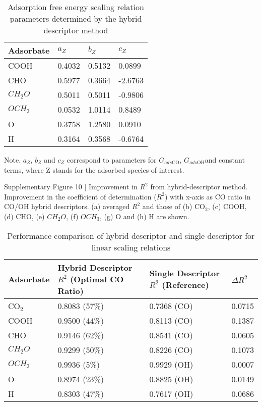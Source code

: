 \begin{table}[h]
  \centering
  {\fontsize{10}{12}\selectfont
  \begin{tabular}{*{4}{l}}
    \hline
    \textbf{Adsorbate} & \textbf{$a_Z$}  & \textbf{$b_Z$}  & \textbf{$c_Z$}   \\
    \hline
    COOH      & 0.4032 & 0.5132 & 0.0899  \\
    CHO       & 0.5977 & 0.3664 & -2.6763 \\
    $CH_2O$   & 0.5011 & 0.5011 & -0.9806 \\
    $OCH_3$   & 0.0532 & 1.0114 & 0.8489  \\
    O         & 0.3758 & 1.2580 & 0.0910  \\
    H         & 0.3164 & 0.3568 & -0.6764 \\
    \hline
  \end{tabular}
  }
  \caption{Adsorption free energy scaling relation parameters determined by the hybrid descriptor method}
  \label{si_table13}
\end{table}
Note. $a_{\mathit{Z}}$, $b_{\mathit{Z}}$ and $c_{\mathit{Z}}$ correspond to parameters for $G_{\mathit{ads}\mathrm{CO}}$, $G_{\mathit{ads}\mathrm{OH}}$and constant terms, where Z stands for the adsorbed species of interest.


Supplementary Figure 10 | Improvement in $R^2$ from hybrid-descriptor method. Improvement in the coefficient of determination ($R^2$) with x-axis as CO ratio in CO/OH hybrid descriptors. (a) averaged $R^2$ and those of (b) CO$_2$, (c) COOH, (d) CHO, (e) $CH_2O$, (f) $OCH_3$, (g) O and (h) H are shown.

\begin{table}[h]
  \centering
  {\fontsize{10}{12}\selectfont
  \begin{tabular}{*{4}{l}}
    \hline
    Adsorbate & Hybrid Descriptor $R^2$ (Optimal CO Ratio) & Single Descriptor $R^2$ (Reference) & $\Delta R^2$ \\
    \hline
    CO$_2$    & 0.8083 (57\%)  & 0.7368 (CO)  & 0.0715 \\
    COOH      & 0.9500 (44\%)  & 0.8113 (CO)  & 0.1387 \\
    CHO       & 0.9146 (62\%)  & 0.8541 (CO)  & 0.0605 \\
    $CH_2O$   & 0.9299 (50\%)  & 0.8226 (CO)  & 0.1073 \\
    $OCH_3$   & 0.9936 (5\%)   & 0.9929 (OH)  & 0.0007 \\
    O         & 0.8974 (23\%)  & 0.8825 (OH)  & 0.0149 \\
    H         & 0.8303 (47\%)  & 0.7617 (OH)  & 0.0686 \\
    \hline
  \end{tabular}
  }
  \caption{Performance comparison of hybrid descriptor and single descriptor for linear scaling relations}
  \label{si_table14}
\end{table}


